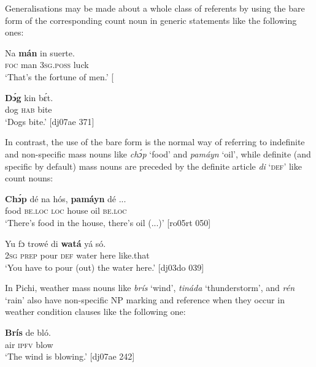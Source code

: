 Generalisations may be made about a whole class of referents by using the bare form of the corresponding count noun in generic statements like the following ones: 



\ea%
    \label{ex:key:222}
    \gll Na  \textbf{mán}  in    suerte.\\
\textsc{foc}  man    \textsc{3sg.poss}  luck\\

\glt ‘That’s the fortune of men.’ [\textstylePichiexamplenumberZchnZchn{fr03ft 194]}
\z


\ea%
    \label{ex:key:223}
    \gll \textbf{Dɔ́g}    kin  bɛ́t.\\
dog    \textsc{hab}  bite\\

\glt ‘Dogs bite.’ [dj07ae 371]
\z

In contrast, the use of the bare form is the normal way of referring to indefinite and non-specific mass nouns like \textit{chɔ́p} ‘food’ and \textit{pamáyn} ‘oil’, while definite (and specific by default) mass nouns are preceded by the definite article \textit{di} ‘\textsc{def’} like count nouns:

\ea%
 \label{ex:key:224}
 \gll  \textbf{Chɔ́p}  dé    na  hós,    \textbf{pamáyn}   dé     \op...\cp\\
food    \textsc{be.loc}  \textsc{loc}  house  oil    \textsc{be.loc}\\

\glt ‘There’s food in the house, there’s oil (...)’ [ro05rt 050]
\z


\ea%
    \label{ex:key:225}
    \gll Yu  fɔ  trowé  di  \textbf{watá}  yá    só.\\
\textsc{2sg}  \textsc{prep}  pour  \textsc{def}  water  here    like.that\\

\glt ‘You have to pour (out) the water here.’ [dj03do 039]
\z

In Pichi, weather mass nouns like \textit{brís} ‘wind’, \textit{tináda} ‘thunderstorm’, and \textit{rén} ‘rain’ also have non-specific NP marking and reference when they occur in weather condition clauses like the following one:


\ea%
    \label{ex:key:226}
    \gll \textbf{Brís}  de  bló.\\
air  \textsc{ipfv}  blow\\

\glt ‘The wind is blowing.’ [dj07ae 242]
\z

